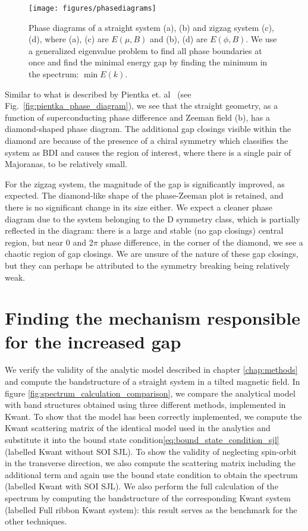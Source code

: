 			\begin{figure}[!htb]
			\centering
			\texttt{[image: figures/phasediagrams]}
			\caption{Phase diagrams of a straight system (a), (b) and zigzag system (c), (d), where (a), (c) are $E(\mu, B)$ and (b), (d) are $E(\phi, B)$.
			We use a generalized eigenvalue problem to find all phase boundaries at once and find the minimal energy gap by finding the minimum in the spectrum: $\min{E(k)}$.
			\label{fig:phasediagrams}}
			\end{figure}

			Similar to what is described by Pientka et. al~\cite{pientka2017topological} (see Fig.~\ref{fig:pientka_phase_diagram}), we see that the straight geometry, as a function of superconducting phase difference and Zeeman field (b), has a diamond-shaped phase diagram.
			The additional gap closings visible within the diamond are because of the presence of a chiral symmetry which classifies the system as BDI and causes the region of interest, where there is a single pair of Majoranas, to be relatively small.

			For the zigzag system, the magnitude of the gap is significantly improved, as expected.
			The diamond-like shape of the phase-Zeeman plot is retained, and there is no significant change in its size either.
			We expect a cleaner phase diagram due to the system belonging to the D symmetry class, which is partially reflected in the diagram: there is a large and stable (no gap closings) central region, but near 0 and 2$\pi$ phase difference, in the corner of the diamond, we see a chaotic region of gap closings.
			We are unsure of the nature of these gap closings, but they can perhaps be attributed to the symmetry breaking being relatively weak.



	\section{Finding the mechanism responsible for the increased gap}
		We verify the validity of the analytic model described in chapter \ref{chap:methods} and compute the bandstructure of a straight system in a tilted magnetic field.
		In figure \ref{fig:spectrum_calculation_comparison}, we compare the analytical model with band structures obtained using three different methods, implemented in Kwant.
		To show that the model has been correctly implemented, we compute the Kwant scattering matrix of the identical model used in the analytics and substitute it into the bound state condition\eqref{eq:bound_state_condition_sjl} (labelled Kwant without SOI SJL).
		To show the validity of neglecting spin-orbit in the transverse direction, we also compute the scattering matrix including the additional term and again use the bound state condition to obtain the spectrum (labelled Kwant with SOI SJL).
		We also perform the full calculation of the spectrum by computing the bandstructure of the corresponding Kwant system (labelled Full ribbon Kwant system): this result serves as the benchmark for the other techniques.

